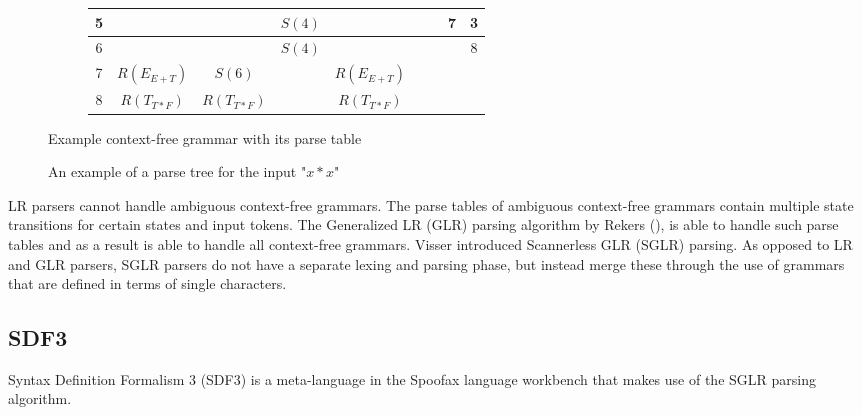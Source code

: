 \begin{figure}[h]
\begin{subfigure}[b]{0.75\textwidth}
\begin{tabular}{ c || c | c | c | c || c | c | c | c }
          \hline
          5 & & & $S(4)$ & & & & 7 & 3 \\
          \hline
          6 & & & $S(4)$ & & & & & 8 \\
          \hline
          7 & $R(E_{E+T})$ & $S(6)$ & & $R(E_{E+T})$ & & & & \\
          \hline
          8 & $R(T_{T*F})$ & $R(T_{T*F})$ & & $R(T_{T*F})$ & & & & \\
        \end{tabular}
        \caption{\label{fig:example-cfg-with-parse-table-tbl}}
      \end{subfigure}
      \caption{\label{fig:example-cfg-with-parse-table}Example context-free grammar with its parse table}
    \end{figure}

    \begin{figure}
      \centering
      \caption{\label{fig:example-parse-tree}An example of a parse tree for the input "$x * x$"}
    \end{figure}

    LR parsers cannot handle ambiguous context-free grammars. The parse tables of ambiguous context-free grammars contain multiple state transitions for certain states and input tokens. The Generalized LR (GLR) parsing algorithm by Rekers (\citeyear{Rekers1992}), is able to handle such parse tables and as a result is able to handle all context-free grammars. Visser \citeyear{Visser97SGLR} introduced Scannerless GLR (SGLR) parsing. As opposed to LR and GLR parsers, SGLR parsers do not have a separate lexing and parsing phase, but instead merge these through the use of grammars that are defined in terms of single characters.

    \subsection{\label{subsec:sdf3}SDF3}

      Syntax Definition Formalism 3 (SDF3) \autocite{VollebregtKV12,AmorimV20} is a meta-language in the Spoofax language workbench that makes use of the SGLR parsing algorithm.

